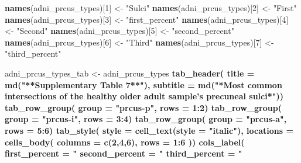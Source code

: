 \documentclass[
]{article}
\newenvironment{Shaded}{\begin{snugshade}}{\end{snugshade}}
\newcommand{\DataTypeTok}[1]{\textcolor[rgb]{0.13,0.29,0.53}{#1}}
\newcommand{\DecValTok}[1]{\textcolor[rgb]{0.00,0.00,0.81}{#1}}
\newcommand{\KeywordTok}[1]{\textcolor[rgb]{0.13,0.29,0.53}{\textbf{#1}}}
\newcommand{\NormalTok}[1]{#1}
\newcommand{\OperatorTok}[1]{\textcolor[rgb]{0.81,0.36,0.00}{\textbf{#1}}}
\newcommand{\StringTok}[1]{\textcolor[rgb]{0.31,0.60,0.02}{#1}}
\begin{document}
\begin{Shaded}
\begin{Highlighting}[]
\KeywordTok{names}\NormalTok{(adni_prcus_types)[}\DecValTok{1}\NormalTok{] <-}\StringTok{ "Sulci"}
\KeywordTok{names}\NormalTok{(adni_prcus_types)[}\DecValTok{2}\NormalTok{] <-}\StringTok{ "First"}
\KeywordTok{names}\NormalTok{(adni_prcus_types)[}\DecValTok{3}\NormalTok{] <-}\StringTok{ "first_percent"}
\KeywordTok{names}\NormalTok{(adni_prcus_types)[}\DecValTok{4}\NormalTok{] <-}\StringTok{ "Second"}
\KeywordTok{names}\NormalTok{(adni_prcus_types)[}\DecValTok{5}\NormalTok{] <-}\StringTok{ "second_percent"}
\KeywordTok{names}\NormalTok{(adni_prcus_types)[}\DecValTok{6}\NormalTok{] <-}\StringTok{ "Third"}
\KeywordTok{names}\NormalTok{(adni_prcus_types)[}\DecValTok{7}\NormalTok{] <-}\StringTok{ "third_percent"}

\NormalTok{adni_prcus_types_tab <-}\StringTok{ }\NormalTok{adni_prcus_types }\OperatorTok{%>%}\StringTok{ }\KeywordTok{gt}\NormalTok{() }\OperatorTok{%>%}
\KeywordTok{tab_header}\NormalTok{(}
  \DataTypeTok{title =} \KeywordTok{md}\NormalTok{(}\StringTok{"**Supplementary Table 7**"}\NormalTok{),}
  \DataTypeTok{subtitle =} \KeywordTok{md}\NormalTok{(}\StringTok{"*Most common intersections of the healthy older adult sample's precuneal sulci*"}\NormalTok{)) }\OperatorTok{%>%}
\KeywordTok{tab_row_group}\NormalTok{(}
    \DataTypeTok{group =} \StringTok{"prcus-p"}\NormalTok{,}
    \DataTypeTok{rows =} \DecValTok{1}\OperatorTok{:}\DecValTok{2}\NormalTok{) }\OperatorTok{%>%}
\KeywordTok{tab_row_group}\NormalTok{(}
    \DataTypeTok{group =} \StringTok{"prcus-i"}\NormalTok{,}
    \DataTypeTok{rows =} \DecValTok{3}\OperatorTok{:}\DecValTok{4}\NormalTok{) }\OperatorTok{%>%}
\KeywordTok{tab_row_group}\NormalTok{(}
    \DataTypeTok{group =} \StringTok{"prcus-a"}\NormalTok{,}
    \DataTypeTok{rows =} \DecValTok{5}\OperatorTok{:}\DecValTok{6}\NormalTok{) }\OperatorTok{%>%}
\KeywordTok{tab_style}\NormalTok{(}
    \DataTypeTok{style =} \KeywordTok{cell_text}\NormalTok{(}\DataTypeTok{style =} \StringTok{"italic"}\NormalTok{),}
    \DataTypeTok{locations =} \KeywordTok{cells_body}\NormalTok{(}
      \DataTypeTok{columns =} \KeywordTok{c}\NormalTok{(}\DecValTok{2}\NormalTok{,}\DecValTok{4}\NormalTok{,}\DecValTok{6}\NormalTok{),}
      \DataTypeTok{rows =} \DecValTok{1}\OperatorTok{:}\DecValTok{6}
\NormalTok{    )) }\OperatorTok{%>%}
\KeywordTok{cols_label}\NormalTok{(}
    \DataTypeTok{first_percent =} \StringTok{"%"}\NormalTok{,}
    \DataTypeTok{second_percent =} \StringTok{"%"}\NormalTok{,}
    \DataTypeTok{third_percent =} \StringTok{"%"}\NormalTok{) }\OperatorTok{%>%}
}}}}}}}}}
\end{Highlighting}
\end{Shaded}
\end{document}
